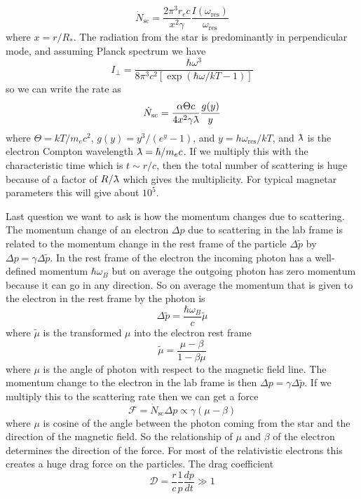 \documentclass[letterpaper, 11pt]{article}
\newcommand{\lambdabar}{{\mkern0.75mu\mathchar '26\mkern -9.75mu\lambda}}
\numberwithin{equation}{section}
\numberwithin{figure}{section}
\begin{document}
\begin{equation}
    \label{eq:62}
    \dot{N}_\mathrm{sc} = \frac{2\pi^3r_ec}{x^2\gamma}\frac{I(\omega_\mathrm{res})}{\omega_\mathrm{res}}
\end{equation}
where $x = r/R_{*}$. The radiation from the star is predominantly in perpendicular mode, and assuming Planck spectrum we have
\begin{equation}
    \label{eq:63}
    I_{\perp} = \frac{\hbar\omega^3}{8\pi^3c^2 \left[ \exp \left( \hbar\omega/kT - 1 \right) \right]}
\end{equation}
so we can write the rate as
\begin{equation}
    \label{eq:64}
    \dot{N}_\mathrm{sc} = \frac{\alpha\Theta c}{4x^2\gamma \lambdabar}\frac{g(y)}{y}
\end{equation}
where $\Theta = kT/m_ec^2$, $g(y) = y^3/(e^y - 1)$, and $y = h\omega_\mathrm{res}/kT$, and $\lambdabar$ is the electron Compton wavelength $\lambdabar = \hbar/m_ec$. If we multiply this with the characteristic time which is $t \sim r/c$, then the total number of scattering is huge because of a factor of $R/\lambdabar$ which gives the multiplicity. For typical magnetar parameters this will give about $10^5$.

Last question we want to ask is how the momentum changes due to scattering. The momentum change of an electron $\Delta p$ due to scattering in the lab frame is related to the momentum change in the rest frame of the particle $\Delta \tilde{p}$ by $\Delta p = \gamma \Delta \tilde{p}$. In the rest frame of the electron the incoming photon has a well-defined momentum $\hbar\omega_B$ but on average the outgoing photon has zero momentum because it can go in any direction. So on average the momentum that is given to the electron in the rest frame by the photon is
\begin{equation}
    \label{eq:65}
    \Delta \tilde{p} = \frac{\hbar\omega_B}{c}\tilde{\mu}
\end{equation}
where $\tilde{\mu}$ is the transformed $\mu$ into the electron rest frame
\begin{equation}
    \label{eq:68}
    \tilde{\mu} = \frac{\mu - \beta}{1 - \beta\mu}
\end{equation}
where $\mu$ is the angle of photon with respect to the magnetic field line. The momentum change to the electron in the lab frame is then $\Delta p = \gamma \Delta \tilde{p}$. If we multiply this to the scattering rate then we can get a force
\begin{equation}
    \label{eq:66}
    \mathcal{F} = \dot{N}_\mathrm{sc}\Delta p \propto \gamma(\mu - \beta)
\end{equation}
where $\mu$ is cosine of the angle between the photon coming from the star and the direction of the magnetic field. So the relationship of $\mu$ and $\beta$ of the electron determines the direction of the force. For most of the relativistic electrons this creates a huge drag force on the particles. The drag coefficient
\begin{equation}
    \label{eq:67}
    \mathcal{D} = \frac{r}{c}\frac{1}{p}\frac{dp}{dt} \gg 1
\end{equation}
\end{document}
